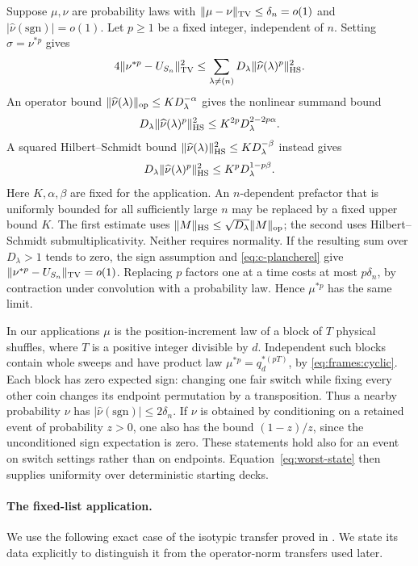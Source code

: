Suppose $\mu,\nu$ are probability laws with
$\|\mu-\nu\|_{\mathrm{TV}}\le\delta_n=o(1)$ and
$|\widehat\nu(\mathrm{sgn})|=o(1)$. Let $p\ge1$ be a fixed integer,
independent of $n$. Setting $\sigma=\nu^{*p}$ gives
\begin{equation}\label{sweeps:completion}
 4\|\nu^{*p}-U_{S_n}\|_{\mathrm{TV}}^2
 \le\sum_{\lambda\ne(n)}D_\lambda
              \|\widehat\nu(\lambda)^p\|_{\mathrm{HS}}^2.
\end{equation}
An operator bound
$\|\widehat\nu(\lambda)\|_{\mathrm{op}}\le K D_\lambda^{-\alpha}$
gives the nonlinear summand bound
\[
 D_\lambda\|\widehat\nu(\lambda)^p\|_{\mathrm{HS}}^2
 \le K^{2p}D_\lambda^{2-2p\alpha}.
\]
A squared Hilbert--Schmidt bound
$\|\widehat\nu(\lambda)\|_{\mathrm{HS}}^2\le K D_\lambda^{-\beta}$
instead gives
\[
 D_\lambda\|\widehat\nu(\lambda)^p\|_{\mathrm{HS}}^2
 \le K^pD_\lambda^{1-p\beta}.
\]
Here $K,\alpha,\beta$ are fixed for the application. An $n$-dependent
prefactor that is uniformly bounded for all sufficiently large $n$ may
be replaced by a fixed upper bound $K$. The first estimate
uses $\|M\|_{\mathrm{HS}}\le\sqrt{D_\lambda}\|M\|_{\mathrm{op}}$; the second
uses Hilbert--Schmidt submultiplicativity. Neither requires normality.
If the resulting sum over $D_\lambda>1$ tends to zero, the sign
assumption and \eqref{eq:c-plancherel} give
$\|\nu^{*p}-U_{S_n}\|_{\mathrm{TV}}=o(1)$. Replacing $p$ factors one at a
time costs at most $p\delta_n$, by contraction under convolution with
a probability law. Hence $\mu^{*p}$ has the same limit.

In our applications $\mu$ is the position-increment law of a block of
$T$ physical shuffles, where $T$ is a positive integer divisible by
$d$. Independent such blocks contain whole sweeps and have product law
$\mu^{*p}=q_d^{*(pT)}$, by \eqref{eq:frames:cyclic}. Each block has
zero expected sign: changing one fair switch while fixing every other
coin changes its endpoint permutation by a transposition. Thus a nearby
probability $\nu$ has
$|\widehat\nu(\mathrm{sgn})|\le2\delta_n$.
If $\nu$ is obtained by conditioning on a retained event of probability
$z>0$, one also has the bound $(1-z)/z$, since the unconditioned sign
expectation is zero. These statements hold also for an event on switch
settings rather than on endpoints. Equation~\eqref{eq:worst-state}
then supplies uniformity over deterministic starting decks.

\paragraph{The fixed-list application.}
We use the following exact case of the isotypic transfer proved in
\cite[Lemma~\ref*{l-l:trim} and Proposition~\ref*{l-l:isotypic}]{partialFourier}.
We state its data explicitly to distinguish it from the operator-norm
transfers used later.

